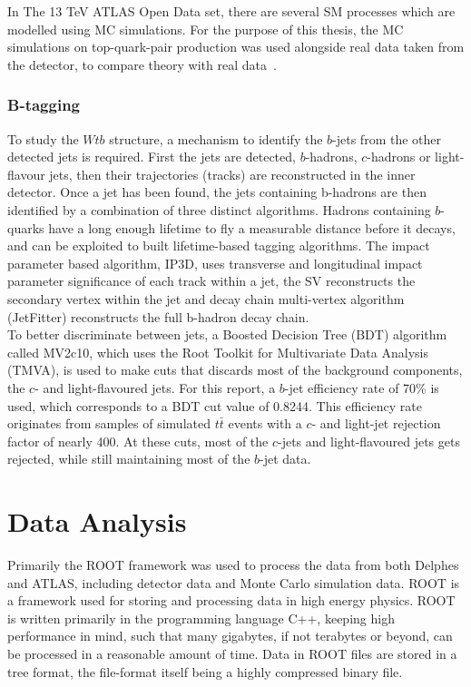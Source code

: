 \documentclass[12pt,a4paper]{article}
\numberwithin{equation}{section}
\begin{document}
In The 13 TeV ATLAS Open Data set, there are several SM processes which are
modelled using MC simulations. For the purpose of this thesis, the MC
simulations on top-quark-pair production was used alongside real data taken from
the detector, to compare theory with real data~\cite{mcopenatlas}.

\subsubsection{B-tagging}
To study the $Wtb$ structure, a mechanism to identify the $b$-jets from the
other detected jets is required. First the jets are detected, $b$-hadrons,
$c$-hadrons or light-flavour jets, then their trajectories (tracks) are
reconstructed in the inner detector. Once a jet has been found, the jets
containing b-hadrons are then identified by a combination of three distinct
algorithms. Hadrons containing $b$-quarks have a long enough lifetime to fly a
measurable distance before it decays, and can be exploited to built
lifetime-based tagging algorithms. The impact parameter based algorithm, IP3D,
uses transverse and longitudinal impact parameter significance of each track
within a jet, the SV reconstructs the secondary vertex within the jet and decay
chain multi-vertex algorithm (JetFitter) reconstructs the full b-hadron
decay chain.\\

To better discriminate between jets, a Boosted Decision Tree (BDT) algorithm
called MV2c10, which uses the Root Toolkit for Multivariate Data Analysis
(TMVA), is used to make cuts that discards most of the background components,
the $c$- and light-flavoured jets. For this report, a $b$-jet efficiency rate of
70\% is used, which corresponds to a BDT cut value of 0.8244. This efficiency
rate originates from samples of simulated $t\bar t$ events with a $c$- and
light-jet rejection factor of nearly 400\cite{ATL-PHYS-PUB-2016-012}. At these
cuts, most of the $c$-jets and light-flavoured jets gets rejected, while still
maintaining most of the $b$-jet data.


\section{Data Analysis}
Primarily the ROOT framework was used to process the data from both Delphes and
ATLAS, including detector data and Monte Carlo simulation data. ROOT is a
framework used for storing and processing data in high energy physics. ROOT is
written primarily in the programming language C++, keeping high performance in
mind, such that many gigabytes, if not terabytes or beyond, can be processed in
a reasonable amount of time. Data in ROOT files are stored in a tree format, the
file-format itself being a highly compressed binary file.\cite{root}
\end{document}
